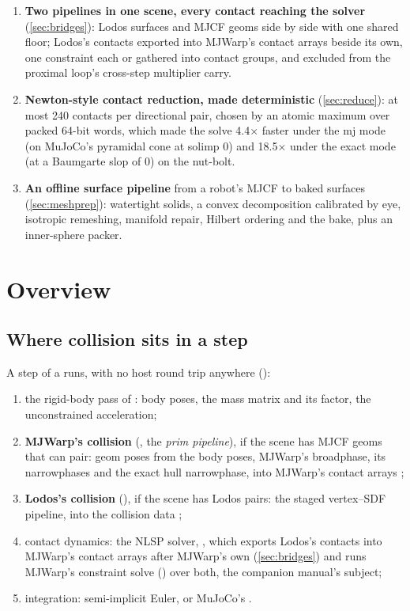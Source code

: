 \begin{enumerate}
\item \textbf{Two pipelines in one scene, every contact reaching the solver} (\cref{sec:bridges}): Lodos surfaces and MJCF geoms side by side with one shared floor; Lodos's contacts exported into MJWarp's contact arrays beside its own, one constraint each or gathered into contact groups, and excluded from the proximal loop's cross-step multiplier carry.
\item \textbf{Newton-style contact reduction, made deterministic} (\cref{sec:reduce}): at most 240 contacts per directional pair, chosen by an atomic maximum over packed 64-bit words, which made the solve 4.4$\times$ faster under the mj mode (on MuJoCo's pyramidal cone at solimp  0) and 18.5$\times$ under the exact mode (at a Baumgarte slop of 0) on the nut-bolt.
\item \textbf{An offline surface pipeline} from a robot's MJCF to baked surfaces (\cref{sec:meshprep}): watertight solids, a convex decomposition calibrated by eye, isotropic remeshing, manifold repair, Hilbert ordering and the bake, plus an inner-sphere packer.
\end{enumerate}

\section{Overview}\label{sec:overview}

\subsection{Where collision sits in a step}\label{sec:step}

A step of a  runs, with no host round trip anywhere ():

\begin{enumerate}
\item the rigid-body pass of : body poses, the mass matrix and its factor, the unconstrained acceleration;
\item \textbf{MJWarp's collision} (, the \emph{prim pipeline}), if the scene has MJCF geoms that can pair: geom poses from the body poses, MJWarp's broadphase, its narrowphases and the exact hull narrowphase, into MJWarp's contact arrays ;
\item \textbf{Lodos's collision} (), if the scene has Lodos pairs: the staged vertex--SDF pipeline, into the collision data ;
\item contact dynamics: the NLSP solver, , which exports Lodos's contacts into MJWarp's contact arrays after MJWarp's own (\cref{sec:bridges}) and runs MJWarp's constraint solve () over both, the companion manual's subject;
\item integration: semi-implicit Euler, or MuJoCo's .
\end{enumerate}

